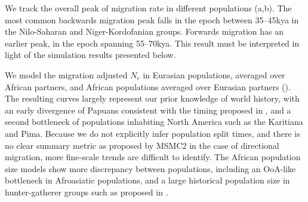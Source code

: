   

We track the overall peak of migration rate in different populations (a,b). The most common backwards migration peak falls in the epoch between 35--45kya in the Nilo-Saharan and Niger-Kordofanian groups. Forwards migration has an earlier peak, in the epoch spanning 55--70kya. This result must be interpreted in light of the simulation results presented below.  

We model the migration adjusted $N_e$ in Eurasian populations, averaged over African partners, and African populations averaged over Eurasian partners (). The resulting curves largely represent our prior knowledge of world history, with an early divergence of Papuans consistent with the timing proposed in \cite{Malaspinas2016}, and a second bottleneck of populations inhabiting North America such as the Karitiana and Pima. Because we do not explicitly infer population split times, and there is no clear summary metric as proposed by MSMC2 in the case of directional migration, more fine-scale trends are difficult to identify. The African population size models show more discrepancy between populations, including an OoA-like bottleneck in Afroasiatic populations, and a large historical population size in hunter-gatherer groups such as proposed in \cite{Lipson2019}. 


